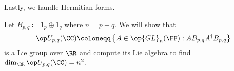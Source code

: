 \documentclass[../notes.tex]{subfiles}
\begin{document}
Lastly, we handle Hermitian forms.
\begin{example}
	Let $B_{p,q}\coloneqq1_p\oplus1_q$ where $n=p+q$. We will show that
	\[\op U_{p,q}(\CC)\coloneqq\left\{A\in\op{GL}_n(\FF):AB_{p,q}A^\dagger B_{p,q}\right\}\]
	is a Lie group over $\RR$ and compute its Lie algebra to find $\dim_\RR\op U_{p,q}(\CC)=n^2$.
\end{example}
\end{document}
